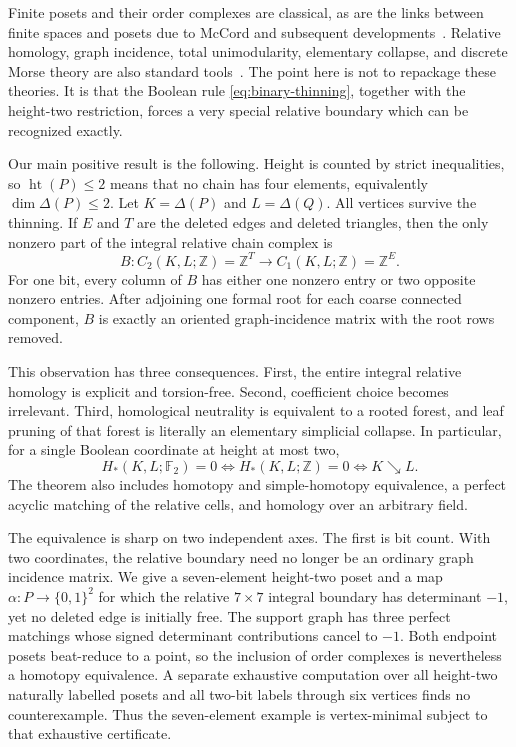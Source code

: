 \documentclass[11pt]{article}
\theoremstyle{definition}
\theoremstyle{remark}
\DeclareMathOperator{\posht}{ht}
\newcommand{\Z}{\mathbb Z}
\newcommand{\Ftwo}{\mathbb F_2}
\newcommand{\D}{\Delta}
\newcommand{\searrowrel}{\mathrel{\searrow}}
\begin{document}
Finite posets and their order complexes are classical, as are the links between finite
spaces and posets due to McCord and subsequent developments~\cite{McCord1966,Barmak2011A,BarmakBook}.
Relative homology, graph incidence, total unimodularity, elementary collapse, and
discrete Morse theory are also standard tools~\cite{Hatcher2002,Forman1998,Kozlov2008,DeyHiraniKrishnamoorthy2011}.
The point here is not to repackage these theories.  It is that the Boolean rule
\eqref{eq:binary-thinning}, together with the height-two restriction, forces a very
special relative boundary which can be recognized exactly.

Our main positive result is the following.  Height is counted by strict inequalities,
so $\posht(P)\le2$ means that no chain has four elements, equivalently $\dim\D(P)\le2$.
Let $K=\D(P)$ and $L=\D(Q)$.  All vertices survive the thinning.  If $E$ and $T$ are
the deleted edges and deleted triangles, then the only nonzero part of the integral
relative chain complex is
\[
  B:C_2(K,L;\Z)=\Z^T\longrightarrow C_1(K,L;\Z)=\Z^E.
\]
For one bit, every column of $B$ has either one nonzero entry or two opposite nonzero
entries.  After adjoining one formal root for each coarse connected component, $B$
is exactly an oriented graph-incidence matrix with the root rows removed.

This observation has three consequences.  First, the entire integral relative homology
is explicit and torsion-free.  Second, coefficient choice becomes irrelevant.  Third,
homological neutrality is equivalent to a rooted forest, and leaf pruning of that
forest is literally an elementary simplicial collapse.  In particular, for a single
Boolean coordinate at height at most two,
\[
\boxed{
  H_*(K,L;\Ftwo)=0
  \iff H_*(K,L;\Z)=0
  \iff K\searrowrel L.
}
\]
The theorem also includes homotopy and simple-homotopy equivalence, a perfect acyclic
matching of the relative cells, and homology over an arbitrary field.

The equivalence is sharp on two independent axes.  The first is bit count.  With two
coordinates, the relative boundary need no longer be an ordinary graph incidence
matrix.  We give a seven-element height-two poset and a map
$\alpha:P\to\{0,1\}^2$ for which the relative $7\times7$ integral boundary has
determinant $-1$, yet no deleted edge is initially free.  The support graph has three
perfect matchings whose signed determinant contributions cancel to $-1$.  Both endpoint
posets beat-reduce to a point, so the inclusion of order complexes is nevertheless a
homotopy equivalence.  A separate exhaustive computation over all height-two naturally
labelled posets and all two-bit labels through six vertices finds no counterexample.
Thus the seven-element example is vertex-minimal subject to that exhaustive certificate.
\end{document}

